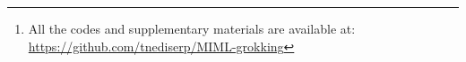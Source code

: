\begin{abstract}
    We reproduce the grokking phenomenon [Power et al., 2022], that a neural network generalizes long after it memorizes the training data, for modular addition problem, and provide an explanation based on [Kumar et al., ICLR 2024].
    \footnote{All the codes and supplementary materials are available at: \url{https://github.com/tnediserp/MIML-grokking}}
\end{abstract}